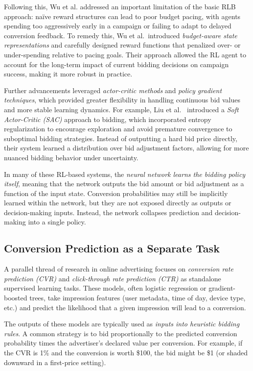 \documentclass[11pt]{article}
\begin{document}
Following this, Wu et al. \cite{10.1145/3514221.3526128} addressed an important limitation of the basic RLB approach: naïve reward structures can lead to poor budget pacing, with agents spending too aggressively early in a campaign or failing to adapt to delayed conversion feedback. To remedy this, Wu et al.\ introduced \emph{budget-aware state representations} and carefully designed reward functions that penalized over- or under-spending relative to pacing goals. Their approach allowed the RL agent to account for the long-term impact of current bidding decisions on campaign success, making it more robust in practice.

Further advancements leveraged \emph{actor-critic methods} and \emph{policy gradient techniques}, which provided greater flexibility in handling continuous bid values and more stable learning dynamics. For example, Liu et al.\ \cite{liu2021bidoptimizationusingmaximum} introduced a \emph{Soft Actor-Critic (SAC)} approach to bidding, which incorporated entropy regularization to encourage exploration and avoid premature convergence to suboptimal bidding strategies. Instead of outputting a hard bid price directly, their system learned a distribution over bid adjustment factors, allowing for more nuanced bidding behavior under uncertainty.

In many of these RL-based systems, the \emph{neural network learns the bidding policy itself}, meaning that the network outputs the bid amount or bid adjustment as a function of the input state. Conversion probabilities may still be implicitly learned within the network, but they are not exposed directly as outputs or decision-making inputs. Instead, the network collapses prediction and decision-making into a single policy.

\subsection{Conversion Prediction as a Separate Task}

A parallel thread of research in online advertising focuses on \emph{conversion rate prediction (CVR)} and \emph{click-through rate prediction (CTR)} as standalone supervised learning tasks. These models, often logistic regression or gradient-boosted trees, take impression features (user metadata, time of day, device type, etc.) and predict the likelihood that a given impression will lead to a conversion.

The outputs of these models are typically used as \emph{inputs into heuristic bidding rules}. A common strategy is to bid proportionally to the predicted conversion probability times the advertiser's declared value per conversion. For example, if the CVR is 1\% and the conversion is worth \$100, the bid might be \$1 (or shaded downward in a first-price setting).
\end{document}
